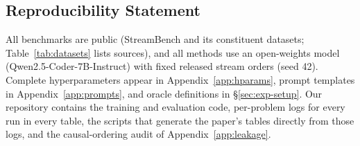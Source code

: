 \subsection*{Reproducibility Statement}
All benchmarks are public (StreamBench and its constituent datasets;
Table~\ref{tab:datasets} lists sources), and all methods use an open-weights
model (Qwen2.5-Coder-7B-Instruct) with fixed released stream orders (seed 42).
Complete hyperparameters appear in Appendix~\ref{app:hparams}, prompt templates
in Appendix~\ref{app:prompts}, and oracle definitions in \S\ref{sec:exp-setup}.
Our repository contains the training and evaluation code, per-problem logs for
every run in every table, the scripts that generate the paper's tables directly
from those logs, and the causal-ordering audit of Appendix~\ref{app:leakage}.
